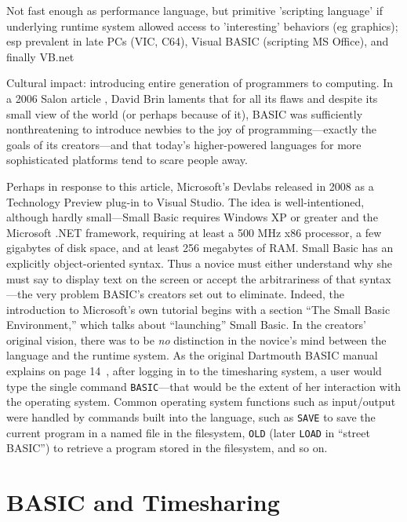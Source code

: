 \documentclass{article}
\newcommand{\T}{\texttt}
\newcommand{\C}[1]{\textsf{\upshape{\textbf{#1}}}}
\begin{document}
Not fast enough as performance language, but primitive 'scripting
language' if underlying runtime system allowed access to 'interesting'
behaviors (eg graphics); esp prevalent in late PCs (VIC, C64), Visual
BASIC (scripting MS Office), and finally VB.net

Cultural impact: introducing entire generation of programmers to
computing.
In a 2006 Salon article ,
David Brin laments that for
all its flaws and despite its small view of the world (or perhaps
because of it), BASIC was sufficiently
nonthreatening to introduce newbies to the joy of programming---exactly
the goals of its creators---and that today's higher-powered languages
for more sophisticated platforms tend to scare people away.

Perhaps in response to this article, Microsoft's Devlabs 
released  in 2008 as a
Technology Preview plug-in to Visual Studio.
The idea is well-intentioned, although hardly small---Small Basic
requires Windows XP or greater and the Microsoft .NET framework,
requiring at least a 500
MHz x86 processor, a few gigabytes of disk space, and at least 256
megabytes of RAM.
Small Basic has an explicitly
object-oriented syntax.  Thus a novice must either understand why she
must say \C{TextWindow.WriteLine("Hello world")} to display text on the
screen or accept the arbitrariness of that syntax---the very problem
BASIC's creators set out to eliminate.  Indeed, the introduction to
Microsoft's own tutorial begins with a section ``The Small Basic
Environment,'' which talks about ``launching'' Small Basic.  In the
creators' original vision, there was to be \emph{no} distinction in the
novice's mind between the language and the runtime system.  As the
original Dartmouth BASIC manual explains on page
14~\cite{dartmouth_basic_manual}, after logging in to the timesharing
system, a user would type the single command \T{BASIC}---that would be the
extent of her interaction with the operating system.  Common operating
system functions such as input/output were handled by commands built
into the language, such as \T{SAVE} to save the current program in a
named file in the filesystem, \T{OLD} (later \T{LOAD} in ``street
BASIC'') to retrieve a program stored in the filesystem, and so on.

\section{BASIC and Timesharing}
\end{document}
